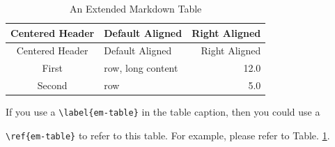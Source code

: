 \documentclass[10pt, a4paper, oneside]{book}
\begin{document}
\begin{longtable}[c]{@{}clr@{}}
\caption{An Extended Markdown Table \label{em-table}}\tabularnewline
\toprule
\begin{minipage}[b]{0.14\columnwidth}\centering\strut
Centered
Header
\strut\end{minipage} & \begin{minipage}[b]{0.11\columnwidth}\raggedright\strut
Default
Aligned
\strut\end{minipage} & \begin{minipage}[b]{0.11\columnwidth}\raggedleft\strut
Right
Aligned
\strut\end{minipage}\tabularnewline
\midrule
\endfirsthead
\toprule
\begin{minipage}[b]{0.14\columnwidth}\centering\strut
Centered
Header
\strut\end{minipage} & \begin{minipage}[b]{0.11\columnwidth}\raggedright\strut
Default
Aligned
\strut\end{minipage} & \begin{minipage}[b]{0.11\columnwidth}\raggedleft\strut
Right
Aligned
\strut\end{minipage}\tabularnewline
\midrule
\endhead
\begin{minipage}[t]{0.14\columnwidth}\centering\strut
First
\strut\end{minipage} & \begin{minipage}[t]{0.11\columnwidth}\raggedright\strut
row,
long
content
\strut\end{minipage} & \begin{minipage}[t]{0.11\columnwidth}\raggedleft\strut
12.0
\strut\end{minipage}\tabularnewline
\begin{minipage}[t]{0.14\columnwidth}\centering\strut
Second
\strut\end{minipage} & \begin{minipage}[t]{0.11\columnwidth}\raggedright\strut
row
\strut\end{minipage} & \begin{minipage}[t]{0.11\columnwidth}\raggedleft\strut
5.0
\strut\end{minipage}\tabularnewline
\bottomrule
\end{longtable}

If you use a \texttt{\textbackslash{}label\{em-table\}} in the table caption, then you could use a

\texttt{\textbackslash{}ref\{em-table\}} to refer to this table.
For example, please refer to Table. \ref{em-table}.
\end{document}

